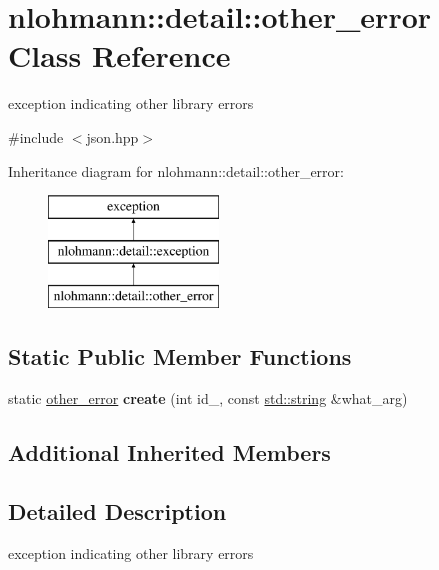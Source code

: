 \hypertarget{classnlohmann_1_1detail_1_1other__error}{}\section{nlohmann\+:\+:detail\+:\+:other\+\_\+error Class Reference}
\label{classnlohmann_1_1detail_1_1other__error}


exception indicating other library errors  




{\ttfamily \#include $<$json.\+hpp$>$}

Inheritance diagram for nlohmann\+:\+:detail\+:\+:other\+\_\+error\+:\begin{figure}[H]
\begin{center}
\leavevmode
\includegraphics[height=3.000000cm]{classnlohmann_1_1detail_1_1other__error}
\end{center}
\end{figure}
\subsection*{Static Public Member Functions}
\begin{DoxyCompactItemize}
\item 
\mbox{\label{classnlohmann_1_1detail_1_1other__error_a87e8ab894e8c85c0d97a0919782d3683}} 
static \hyperlink{classnlohmann_1_1detail_1_1other__error}{other\+\_\+error} {\bfseries create} (int id\+\_\+, const \hyperlink{namespacenlohmann_1_1detail_a90aa5ef615aa8305e9ea20d8a947980fab45cffe084dd3d20d928bee85e7b0f21}{std\+::string} \&what\+\_\+arg)
\end{DoxyCompactItemize}
\subsection*{Additional Inherited Members}


\subsection{Detailed Description}
exception indicating other library errors 

